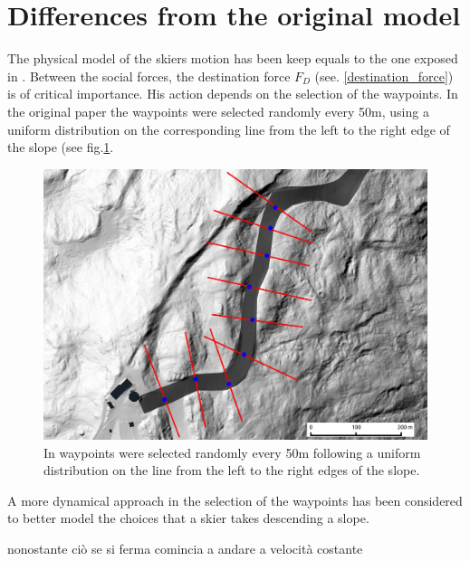 \documentclass[12pt,a4paper,twoside]{book}
\begin{document}
\section{Differences from the original model}
The physical model of the skiers motion has been keep equals to the one exposed in \cite{hol2012}. Between the social forces, the destination force $F_D$ (see. \ref{destination_force}) is of critical importance. His action depends on  the selection of the waypoints. In the original paper the waypoints were selected randomly every 50m, using a uniform distribution on the corresponding line from the left
to the right edge of the slope (see fig.\ref{waypoints_old_pic}.

\begin{figure}[!ht]
  \begin{center}
    \includegraphics[width=\textwidth]{images/waypoint_line.eps}
    \caption{In \cite{hol2012} waypoints were selected randomly every 50m following a uniform distribution on the line from the left to the right edges of the slope.}\label{waypoints_old_pic}
  \end{center}
\end{figure}

A more dynamical approach in the selection of the waypoints has  been considered to better model the choices that a skier takes descending a slope. 


nonostante ciò se si ferma comincia a andare a velocità costante



\end{document}
